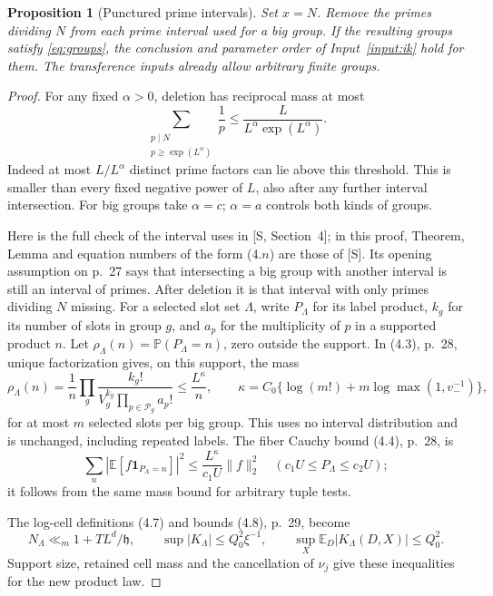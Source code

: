 \documentclass[11pt]{article}
\newtheorem{proposition}[theorem]{Proposition}
\theoremstyle{definition}
\newcommand{\E}{\mathbb E}
\newcommand{\Prob}{\mathbb P}
\newcommand{\ind}{\mathbf 1}
\newcommand{\Pset}{\mathcal P}
\theoremstyle{remark}
\begin{document}
\begin{proposition}[Punctured prime intervals]\label{prop:punctures}
Set $x=N$. Remove the primes dividing $N$ from each prime interval
used for a big group. If the resulting groups satisfy
\eqref{eq:groups}, the conclusion and parameter order of
Input~\ref{input:ik} hold for them.
The transference inputs already allow arbitrary finite groups.
\end{proposition}
\begin{proof}
For any fixed $\alpha>0$, deletion has reciprocal mass at most
\begin{equation}\label{eq:deleted-mass}
\sum_{\substack{p\mid N\\p\ge\exp(L^\alpha)}}\frac1p
\le\frac{L}{L^\alpha\exp(L^\alpha)}.
\end{equation}
Indeed at most $L/L^\alpha$ distinct prime factors can lie above this
threshold. This is smaller than every fixed negative power of $L$,
also after any further interval intersection. For big groups take
$\alpha=c$; $\alpha=a$ controls both kinds of groups.

Here is the full check of the interval uses in [S, Section~4]; in this proof, Theorem, Lemma and equation numbers of the form (4.$n$) are those of [S].
Its opening assumption on p.~27 says that intersecting a big group
with another interval is still an interval of primes. After deletion
it is that interval with only primes dividing $N$ missing.
For a selected slot set $\Lambda$, write $P_\Lambda$ for its label
product, $k_g$ for its number of slots in group $g$, and $a_p$ for
the multiplicity of $p$ in a supported product $n$.
Let $\rho_\Lambda(n)=\Prob(P_\Lambda=n)$, zero outside the support.
In (4.3), p.~28, unique factorization gives, on this support, the mass
\begin{equation}\label{eq:product-collapse}
\rho_\Lambda(n)
=\frac1n\prod_g\frac{k_g!}{V_g^{k_g}\prod_{p\in\Pset_g}a_p!}
\le \frac{L^\kappa}{n},\qquad
\kappa=C_0\{\log(m!)+m\log\max(1,v_-^{-1})\},
\end{equation}
for at most $m$ selected slots per big group. This uses no interval
distribution and is unchanged, including repeated labels.
The fiber Cauchy bound (4.4), p.~28, is
\begin{equation}\label{eq:fiber-collapse}
\sum_n|\E[f\ind_{P_\Lambda=n}]|^2
\le \frac{L^\kappa}{c_1U}\|f\|_2^2
\quad(c_1U\le P_\Lambda\le c_2U);
\end{equation}
it follows from the same mass bound for arbitrary tuple tests.

The log-cell definitions (4.7) and bounds (4.8), p.~29, become
\begin{equation}\label{eq:cell-bounds}
N_\Lambda\ll_m1+TL^d/\mathfrak h,\qquad
\sup|K_\Lambda|\le Q_0^2\xi^{-1},\qquad
\sup_X\E_D|K_\Lambda(D,X)|\le Q_0^2.
\end{equation}
Support size, retained cell mass and the cancellation of $\nu_j$
give these inequalities for the new product law.


\end{proof}
\end{document}
